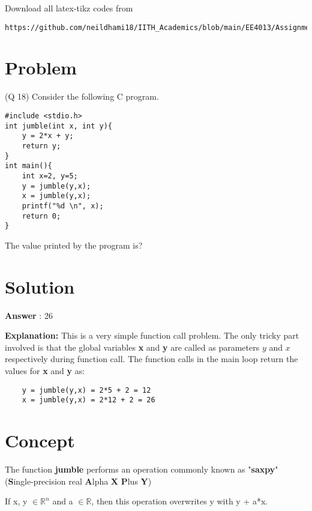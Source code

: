 \documentclass[journal,12pt,twocolumn]{IEEEtran}
\begin{document}
Download all latex-tikz codes from 
\lstset{language=XML, basicstyle=\ttfamily}
\begin{lstlisting}
https://github.com/neildhami18/IITH_Academics/blob/main/EE4013/Assignment1/Assignment1.tex
\end{lstlisting}
\section{Problem}
(Q 18) Consider the following C program.


\begin{lstlisting}
#include <stdio.h>
int jumble(int x, int y){
    y = 2*x + y;
    return y;
}
int main(){
    int x=2, y=5;
    y = jumble(y,x);
    x = jumble(y,x);
    printf("%d \n", x);
    return 0;
}
\end{lstlisting}
The value printed by the program is?

\section{Solution}
\textbf{Answer} : 26
\newline

\textbf{Explanation:}
\newline
This is a very simple function call problem. The only tricky part involved is that the global variables \textbf{x} and \textbf{y} are called as parameters $y$ and $x$ respectively during function call. The function calls in the main loop return the values for \textbf{x} and \textbf{y} as:
\begin{lstlisting}
    y = jumble(y,x) = 2*5 + 2 = 12
    x = jumble(y,x) = 2*12 + 2 = 26
\end{lstlisting}

\section{Concept}
The function \textbf{jumble} performs an operation commonly known as "\textbf{saxpy}" (\textbf{S}ingle-precision real \textbf{A}lpha \textbf{X} \textbf{P}lus \textbf{Y})

\begin{definition}[Saxpy]
If x, y $\in \mathbb{R}^{n}$ and a $\in \mathbb{R}$, then this operation overwrites y with y + a*x. 
\end{definition}
\end{document}
